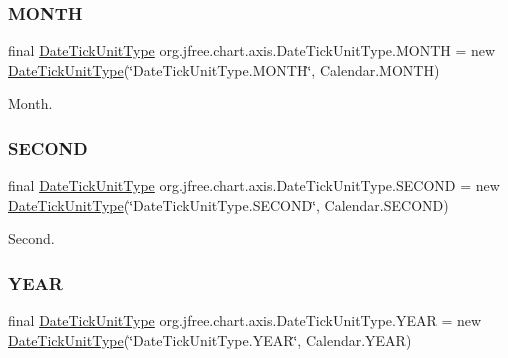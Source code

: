 \subsubsection{\texorpdfstring{M\+O\+N\+TH}{MONTH}}
{\footnotesize\ttfamily final \mbox{\hyperlink{classorg_1_1jfree_1_1chart_1_1axis_1_1_date_tick_unit_type}{Date\+Tick\+Unit\+Type}} org.\+jfree.\+chart.\+axis.\+Date\+Tick\+Unit\+Type.\+M\+O\+N\+TH = new \mbox{\hyperlink{classorg_1_1jfree_1_1chart_1_1axis_1_1_date_tick_unit_type}{Date\+Tick\+Unit\+Type}}(\char`\"{}Date\+Tick\+Unit\+Type.\+M\+O\+N\+TH\char`\"{}, Calendar.\+M\+O\+N\+TH)\hspace{0.3cm}{\ttfamily [static]}}

Month. \mbox{\label{classorg_1_1jfree_1_1chart_1_1axis_1_1_date_tick_unit_type_a88058bf36dcefb7473c6f9042729bbe7}} 
\subsubsection{\texorpdfstring{S\+E\+C\+O\+ND}{SECOND}}
{\footnotesize\ttfamily final \mbox{\hyperlink{classorg_1_1jfree_1_1chart_1_1axis_1_1_date_tick_unit_type}{Date\+Tick\+Unit\+Type}} org.\+jfree.\+chart.\+axis.\+Date\+Tick\+Unit\+Type.\+S\+E\+C\+O\+ND = new \mbox{\hyperlink{classorg_1_1jfree_1_1chart_1_1axis_1_1_date_tick_unit_type}{Date\+Tick\+Unit\+Type}}(\char`\"{}Date\+Tick\+Unit\+Type.\+S\+E\+C\+O\+ND\char`\"{}, Calendar.\+S\+E\+C\+O\+ND)\hspace{0.3cm}{\ttfamily [static]}}

Second. \mbox{\label{classorg_1_1jfree_1_1chart_1_1axis_1_1_date_tick_unit_type_a8b70b7582857b76185a3e97c90e2ef9c}} 
\subsubsection{\texorpdfstring{Y\+E\+AR}{YEAR}}
{\footnotesize\ttfamily final \mbox{\hyperlink{classorg_1_1jfree_1_1chart_1_1axis_1_1_date_tick_unit_type}{Date\+Tick\+Unit\+Type}} org.\+jfree.\+chart.\+axis.\+Date\+Tick\+Unit\+Type.\+Y\+E\+AR = new \mbox{\hyperlink{classorg_1_1jfree_1_1chart_1_1axis_1_1_date_tick_unit_type}{Date\+Tick\+Unit\+Type}}(\char`\"{}Date\+Tick\+Unit\+Type.\+Y\+E\+AR\char`\"{}, Calendar.\+Y\+E\+AR)\hspace{0.3cm}{\ttfamily [static]}}

